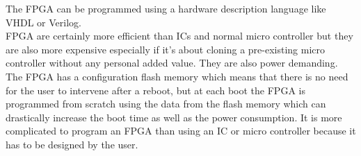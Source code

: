 The FPGA can be programmed using a hardware description language like VHDL or Verilog. \\

FPGA are certainly more efficient than ICs and normal micro controller but they are also more expensive especially if it’s about cloning a pre-existing micro controller without any personal added value. They are also power demanding. The FPGA has a configuration flash memory which means that there is no need for the user to intervene after a reboot, but at each boot the FPGA is programmed from scratch using the data from the flash memory which can drastically increase the boot time as well as the power consumption. It is more complicated to program an FPGA than using an IC or micro controller because it has to be designed by the user. \\








